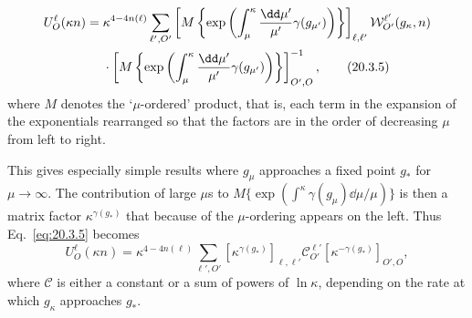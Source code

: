 \begin{align}
U_O^\ell(\kappa n)
={}&\kappa^{4-4n(\ell)}
\sum_{\ell',O'}
\left[
M\left\{
\exp\left(\int_\mu^\kappa\frac{\dd\mu'}{\mu'}\gamma(g_{\mu'})\right)
\right\}
\right]_{\ell,\ell'}
\mathcal W_{O'}^{\ell'}(g_\kappa,n)
\notag\\
&\cdot
\left[
M\left\{
\exp\left(\int_\mu^\kappa\frac{\dd\mu'}{\mu'}\gamma(g_{\mu'})\right)
\right\}
\right]^{-1}_{O',O},
\tag{20.3.5}\label{eq:20.3.5}
\end{align}
where $M$ denotes the `$\mu$-ordered' product, that is, each term in the expansion of the exponentials rearranged so that the factors are in the order of decreasing $\mu$ from left to right.

This gives especially simple results where $g_\mu$ approaches a fixed point $g_*$ for $\mu\to\infty$. The contribution of large $\mu$s to $M\{\exp(\int^\kappa\gamma(g_\mu)\dd\mu/\mu)\}$ is then a matrix factor $\kappa^{\gamma(g_*)}$ that because of the $\mu$-ordering appears on the left. Thus Eq.~\eqref{eq:20.3.5} becomes
\begin{equation}
U_O^\ell(\kappa n)
=\kappa^{4-4n(\ell)}
\sum_{\ell',O'}
\left[\kappa^{\gamma(g_*)}\right]_{\ell,\ell'}
\mathcal C_{O'}^{\ell'}
\left[\kappa^{-\gamma(g_*)}\right]_{O',O},
\tag{20.3.6}\label{eq:20.3.6}
\end{equation}
where $\mathcal C$ is either a constant or a sum of powers of $\ln\kappa$, depending on the rate at which $g_\kappa$ approaches $g_*$.

